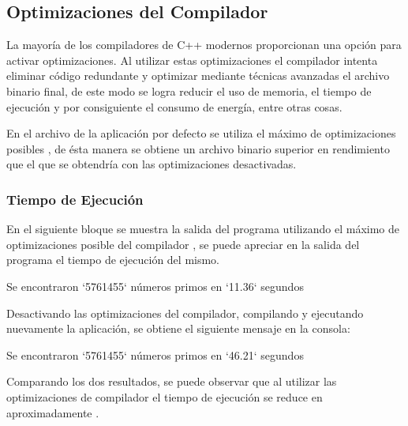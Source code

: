 \documentclass[12pt]{article}
\newenvironment{fullgrayverb}
{\verbbox}
{\endverbbox\par\colorbox{gray!25}{\parbox{\textwidth}{\theverbbox}}\par}
\begin{document}
\subsection{Optimizaciones del Compilador}

La mayoría de los compiladores de C++ modernos proporcionan una opción para
activar optimizaciones. Al utilizar estas optimizaciones el compilador
intenta eliminar código redundante y optimizar mediante técnicas avanzadas el
archivo binario final, de este modo se logra reducir el uso de memoria, el
tiempo de ejecución y por consiguiente el consumo de energía, entre otras cosas.

En el archivo  de la aplicación por defecto se utiliza el máximo
de optimizaciones posibles , de ésta manera se obtiene un archivo
binario superior en rendimiento que el que se obtendría con las optimizaciones
desactivadas.


\subsubsection{Tiempo de Ejecución}

En el siguiente bloque se muestra la salida del programa utilizando el máximo de
optimizaciones posible del compilador , se puede apreciar en la salida
del programa el tiempo de ejecución del mismo.

\begin{fullgrayverb}
Se encontraron `5761455` números primos en `11.36` segundos
\end{fullgrayverb}

Desactivando las optimizaciones del compilador, compilando y ejecutando
nuevamente la aplicación, se obtiene el siguiente mensaje en la consola:

\begin{fullgrayverb}
Se encontraron `5761455` números primos en `46.21` segundos
\end{fullgrayverb}

Comparando los dos resultados, se puede observar que al utilizar las
optimizaciones de compilador el tiempo de ejecución se reduce en
aproximadamente .

\end{document}
